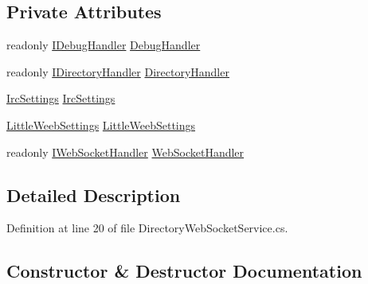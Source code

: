 \subsection*{Private Attributes}
\begin{DoxyCompactItemize}
\item 
readonly \mbox{\hyperlink{interface_little_weeb_library_1_1_handlers_1_1_i_debug_handler}{I\+Debug\+Handler}} \mbox{\hyperlink{class_little_weeb_library_1_1_services_1_1_directory_web_socket_service_a2f5d1d89d38705e969d839baf750deb2}{Debug\+Handler}}
\item 
readonly \mbox{\hyperlink{interface_little_weeb_library_1_1_handlers_1_1_i_directory_handler}{I\+Directory\+Handler}} \mbox{\hyperlink{class_little_weeb_library_1_1_services_1_1_directory_web_socket_service_abf56baaa5c2889b119df9fac310ddcec}{Directory\+Handler}}
\item 
\mbox{\hyperlink{class_little_weeb_library_1_1_settings_1_1_irc_settings}{Irc\+Settings}} \mbox{\hyperlink{class_little_weeb_library_1_1_services_1_1_directory_web_socket_service_af787fc8865b07d96d3436b2b688b2019}{Irc\+Settings}}
\item 
\mbox{\hyperlink{class_little_weeb_library_1_1_settings_1_1_little_weeb_settings}{Little\+Weeb\+Settings}} \mbox{\hyperlink{class_little_weeb_library_1_1_services_1_1_directory_web_socket_service_ad1f0f5e0e86404fb3b899821afa8ecdb}{Little\+Weeb\+Settings}}
\item 
readonly \mbox{\hyperlink{interface_little_weeb_library_1_1_handlers_1_1_i_web_socket_handler}{I\+Web\+Socket\+Handler}} \mbox{\hyperlink{class_little_weeb_library_1_1_services_1_1_directory_web_socket_service_a425caa3dbf037fe98843e9941c2dd7c7}{Web\+Socket\+Handler}}
\end{DoxyCompactItemize}


\subsection{Detailed Description}


Definition at line 20 of file Directory\+Web\+Socket\+Service.\+cs.



\subsection{Constructor \& Destructor Documentation}
\mbox{\label{class_little_weeb_library_1_1_services_1_1_directory_web_socket_service_ac0842064ce4231990ed07bcbacb7a71f}} 
